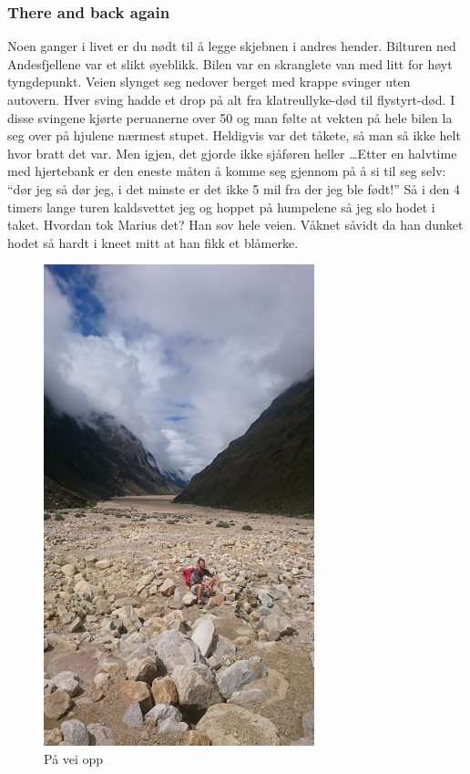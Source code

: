\subsubsection{There and back again}
Noen ganger i livet er du nødt til å legge skjebnen i andres hender.
Bilturen ned Andesfjellene var et slikt øyeblikk. Bilen var en
skranglete van med litt for høyt tyngdepunkt. Veien slynget seg
nedover berget med krappe svinger uten autovern. Hver sving hadde et
drop på alt fra klatreullyke-død til flystyrt-død. I disse svingene
kjørte peruanerne over 50 og man følte at vekten på hele
bilen la seg over på hjulene nærmest stupet. Heldigvis var det tåkete,
så man så ikke helt hvor bratt det var. Men igjen, det gjorde ikke
sjåføren heller \ldots Etter en halvtime med hjertebank er den eneste
måten å komme seg gjennom på å si til seg selv: ``dør jeg så dør jeg,
i det minste er det ikke 5 mil fra der jeg ble født!'' Så i den 4
timers lange turen kaldsvettet jeg og hoppet på humpelene så jeg slo
hodet i taket. Hvordan tok Marius det? Han sov hele veien. Våknet
såvidt da han dunket hodet så hardt i kneet mitt at han fikk et
blåmerke. 

\begin{figure}[!h]
	\centering
	\includegraphics[width=0.7\textwidth]{akselidalen}
	\caption{På vei opp}
\label{fig:akselidalen}
\end{figure}

